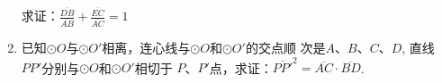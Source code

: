 \begin{enumerate}
求证：$\frac{\overline{DB}}{\overline{AB}}+\frac{\overline{EC}}{\overline{AC}}=1$

\item 已知$\odot O$与$\odot O'$相离，连心线与$\odot O$和$\odot O'$的交点顺
次是$A$、$B$、$C$、$D$, 直线$PP'$分别与$\odot O$和$\odot O'$相切于
$P$、$P'$点，求证：$\overline{PP'}^2=\overline{AC}\cdot \overline{BD}$.
\end{enumerate}
